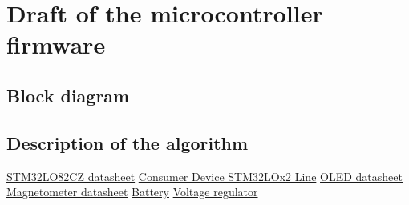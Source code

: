 \documentclass{article}
\begin{document}
\section{Draft of the microcontroller firmware}
\subsection{Block diagram}
\subsection{Description of the algorithm}
\begin{thebibliography}{9}
	\href{https://www.st.com/resource/en/datasheet/stm32l082cz.pdf}{STM32LO82CZ
	datasheet}
	\href{https://www.st.com/en/microcontrollers-microprocessors/stm32l0-series.html}{Consumer
	Device STM32LOx2 Line}
	\href{https://www.mouser.pl/datasheet/2/291/NHD_2_7_12864WDY3-1116258.pdf}{OLED
	datasheet}
	\href{https://cdn-shop.adafruit.com/datasheets/HMC5883L_3-Axis_Digital_Compass_IC.pdf}{Magnetometer
	datasheet}
	\href{https://www.mouser.pl/datasheet/2/118/ltc7p-932904.pdf}{Battery}
	\href{https://www.analog.com/media/en/technical-documentation/data-sheets/3525fc.pdf}{Voltage
	regulator} 
\end{thebibliography}
\end{document}
